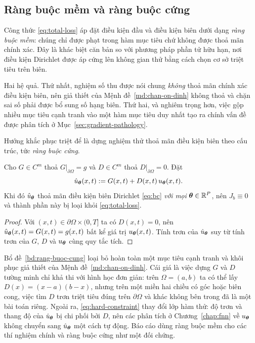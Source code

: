 \subsection{Ràng buộc mềm và ràng buộc cứng}
\label{subsec:rang-buoc}
 
\begin{nhanxet}
\label{rem:soft-constraint}
Công thức \eqref{eq:total-loss} áp đặt điều kiện đầu và điều kiện biên dưới dạng
\emph{ràng buộc mềm}: chúng chỉ được phạt trong hàm mục tiêu chứ không được thoả
mãn chính xác. Đây là khác biệt căn bản so với phương pháp phần tử hữu hạn, nơi
điều kiện Dirichlet được áp cứng lên không gian thử bằng cách chọn cơ sở triệt
tiêu trên biên.
 
Hai hệ quả. Thứ nhất, nghiệm số thu được nói chung \emph{không} thoả mãn chính
xác điều kiện biên, nên giả thiết của Mệnh đề~\ref{md:chan-on-dinh} không thoả
và chặn sai số phải được bổ sung số hạng biên. Thứ hai, và nghiêm trọng hơn, việc
gộp nhiều mục tiêu cạnh tranh vào một hàm mục tiêu duy nhất tạo ra chính vấn đề
được phân tích ở Mục~\ref{sec:gradient-pathology}.
\end{nhanxet}
 
Hướng khắc phục triệt để là dựng nghiệm thử thoả mãn điều kiện biên theo cấu
trúc, tức \emph{ràng buộc cứng}.
 
\begin{bode}
\label{bd:rang-buoc-cung}
Cho $G \in C^{m}$ thoả $G|_{\partial\Omega} = g$ và $D \in C^{m}$ thoả
$D|_{\partial\Omega} = 0$. Đặt
\begin{equation}
\hat{u}_{\bm{\theta}}(x,t) := G(x,t) + D(x,t)\, u_{\bm{\theta}}(x,t).
\label{eq:hard-constraint}
\end{equation}
Khi đó $\hat{u}_{\bm{\theta}}$ thoả mãn điều kiện biên Dirichlet \eqref{eq:bc}
\emph{với mọi} $\bm{\theta} \in \mathbb{R}^P$, nên $J_b \equiv 0$ và thành phần này bị loại
khỏi \eqref{eq:total-loss}.
\end{bode}
 
\begin{proof}
Với $(x,t) \in \partial\Omega\times(0,T]$ ta có $D(x,t) = 0$, nên
$\hat u_{\bm{\theta}}(x,t) = G(x,t) = g(x,t)$ bất kể giá trị $u_{\bm{\theta}}(x,t)$.
Tính trơn của $\hat u_{\bm{\theta}}$ suy từ tính trơn của $G$, $D$ và
$u_{\bm{\theta}}$ cùng quy tắc tích.
\end{proof}
 
Bổ đề~\ref{bd:rang-buoc-cung} loại bỏ hoàn toàn một mục tiêu cạnh tranh và khôi
phục giả thiết của Mệnh đề~\ref{md:chan-on-dinh}. Cái giá là việc dựng $G$ và $D$
tường minh chỉ khả thi với hình học đơn giản: trên $\Omega = (a,b)$ ta có thể lấy
$D(x) = (x-a)(b-x)$, nhưng trên một miền hai chiều có góc hoặc biên cong, việc
tìm $D$ trơn triệt tiêu đúng trên $\partial\Omega$ và khác không bên trong đã là
một bài toán riêng. Ngoài ra, \eqref{eq:hard-constraint} thay đổi lớp hàm thử: độ
trơn và thang độ của $\hat u_{\bm{\theta}}$ bị chi phối bởi $D$, nên các phân tích ở
Chương~\ref{chap:fnn} về $u_{\bm{\theta}}$ không chuyển sang $\hat u_{\bm{\theta}}$ một
cách tự động. Báo cáo dùng ràng buộc mềm cho các thí nghiệm chính và ràng buộc
cứng như một đối chứng.
 
